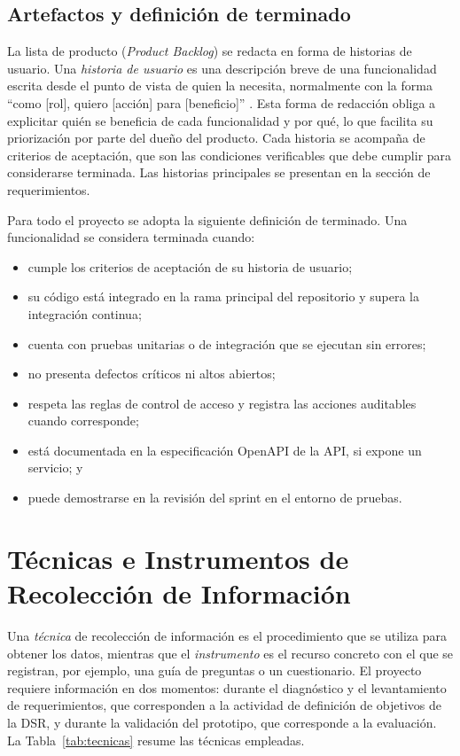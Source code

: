 \subsection{Artefactos y definición de terminado}
La lista de producto (\textit{Product Backlog}) se redacta en forma de historias de usuario. Una \textit{historia de usuario} es una descripción breve de una funcionalidad escrita desde el punto de vista de quien la necesita, normalmente con la forma ``como [rol], quiero [acción] para [beneficio]'' \cite{cohn2004user}. Esta forma de redacción obliga a explicitar quién se beneficia de cada funcionalidad y por qué, lo que facilita su priorización por parte del dueño del producto. Cada historia se acompaña de criterios de aceptación, que son las condiciones verificables que debe cumplir para considerarse terminada. Las historias principales se presentan en la sección de requerimientos.

Para todo el proyecto se adopta la siguiente definición de terminado. Una funcionalidad se considera terminada cuando:

\begin{itemize}
  \item cumple los criterios de aceptación de su historia de usuario;
  \item su código está integrado en la rama principal del repositorio y supera la integración continua;
  \item cuenta con pruebas unitarias o de integración que se ejecutan sin errores;
  \item no presenta defectos críticos ni altos abiertos;
  \item respeta las reglas de control de acceso y registra las acciones auditables cuando corresponde;
  \item está documentada en la especificación OpenAPI de la API, si expone un servicio; y
  \item puede demostrarse en la revisión del sprint en el entorno de pruebas.
\end{itemize}

\section{Técnicas e Instrumentos de Recolección de Información}
Una \textit{técnica} de recolección de información es el procedimiento que se utiliza para obtener los datos, mientras que el \textit{instrumento} es el recurso concreto con el que se registran, por ejemplo, una guía de preguntas o un cuestionario. El proyecto requiere información en dos momentos: durante el diagnóstico y el levantamiento de requerimientos, que corresponden a la actividad de definición de objetivos de la DSR, y durante la validación del prototipo, que corresponde a la evaluación. La Tabla~\ref{tab:tecnicas} resume las técnicas empleadas.

